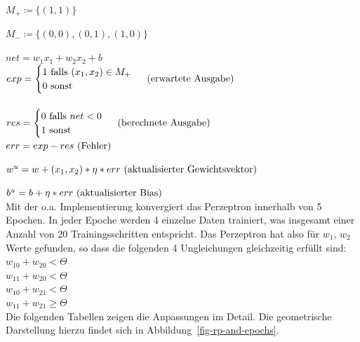 $M_+ \coloneqq \{(1, 1)\}$

$M_- \coloneqq \{(0, 0), (0,1), (1,0)\}$

$net = w_1x_1 + w_2x_2 + b$\\

$exp = \begin{cases}
           1 \text{ falls } (x_1, x_2) \in M_+ \\
           0 \text{ sonst }
\end{cases}  \space \space \text{ (erwartete Ausgabe)}$
\\
\\

$res =  \begin{cases}
            0 \text{ falls } net < 0 \\
            1 \text{ sonst }
\end{cases}  \space \space \text{ (berechnete Ausgabe)}$\\

$err = exp - res  \space \space \text{ (Fehler)}$

$w^u = w + (x_1, x_2) * \eta * err  \space \space \text{ (aktualisierter Gewichtsvektor)}$

$b^u = b + \eta * err \space \space \text{ (aktualisierter Bias)}$\\


\noindent
Mit der o.a. Implementierung konvergiert das Perzeptron innerhalb von 5 Epochen.
In jeder Epoche werden 4 einzelne Daten trainiert, was insgesamt einer Anzahl von 20 Trainingsschritten entspricht.
Das Perzeptron hat also für $w_1$, $w_2$ Werte gefunden, so dass die folgenden 4 Ungleichungen gleichzeitig erfüllt sind:\\



$w_10 + w_20 < \Theta$\\

$w_11 + w_20 < \Theta$\\

$w_10 + w_21 < \Theta$\\

$w_11 + w_21 \geq \Theta$\\



Die folgenden Tabellen zeigen die Anpassungen im Detail.
Die geometrische Darstellung hierzu findet sich in Abbildung~\ref{fig-rp-and-epochs}.

